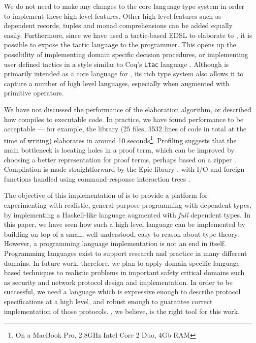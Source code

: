 We do not need to make any changes to the core language type system in order to 
implement these high level features. 
Other high level features such as dependent records, tuples and monad comprehensions
can be added equally easily.  Furthermore, 
since we have used a tactic-based EDSL to elaborate \Idris{} to \TT{}, it is
possible to expose the tactic language to the programmer. This opens up the
possibility of implementing domain specific decision procedures, or implementing
user defined tactics in a style similar to Coq's \texttt{Ltac} language \cite{Delahaye2000}.
Although \TT{} is primarily intended as a core language for \Idris{}, 
its rich type system also allows it to capture a number of high level languages, especially
when augmented with primitive operators. 

We have not discussed the performance of the elaboration
algorithm, or described how \Idris{} compiles to executable code. In practice,
we have found performance to be acceptable --- for example, the \Idris{}
library (25 files, 3532 lines of code in total at the time of writing)
elaborates in around 10 seconds\footnote{On a MacBook Pro, 2.8GHz Intel Core 2
Duo, 4Gb RAM}. Profiling suggests that the main bottleneck is locating holes
in a proof term, which can be improved by choosing a better representation
for proof terms, perhaps based on a zipper \cite{Huet1997}. Compilation is made
straightforward by the Epic library \cite{brady2011epic}, with I/O and foreign
functions handled using command-response interaction trees \cite{Hancock2000}.

The objective of this implementation of \Idris{} is to provide a platform
for experimenting with realistic, general purpose programming with dependent
types, by implementing a Haskell-like language augmented with \emph{full}
dependent types. 
In this paper, we have seen how such a high level language can be implemented
by building on top of a small, well-understood, easy to reason about type
theory. 
However, a programming language implementation is not an end in itself. 
Programming languages exist to support research and practice in many different
domains. In future work, therefore, we plan to apply domain specific
language based techniques to realistic problems
in important safety critical domains such as security and network protocol
design and implementation. In order to be successful, we need a language which
is expressive enough to describe protocol specifications at a high level, and robust 
enough to guarantee correct implementation of those protocols. \Idris{}, we believe,
is the right tool for this work.




